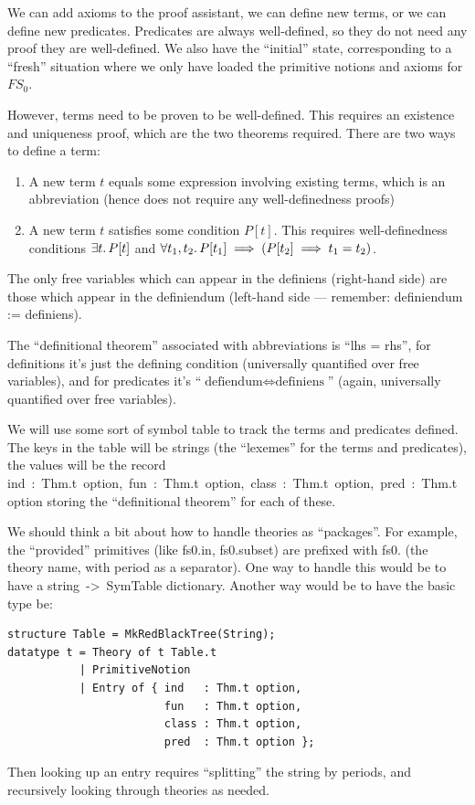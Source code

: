 \begin{node}
We can add axioms to the proof assistant, we can define new terms, or
we can define new predicates. Predicates are always well-defined, so
they do not need any proof they are well-defined. We also have the
``initial'' state, corresponding to a ``fresh'' situation where we
only have loaded the primitive notions and axioms for $FS_{0}$.

However, terms need to be proven to be well-defined. This requires an
existence and uniqueness proof, which are the two theorems
required. There are two ways to define a term:
\begin{enumerate}
\item A new term $t$ equals some expression involving existing terms,
  which is an abbreviation (hence does not require any
  well-definedness proofs)
\item A new term $t$ satisfies some condition $P[t]$. This requires
  well-definedness conditions $\exists t\ldotp P[t]$ and
  $\forall t_{1},t_{2}\ldotp P[t_{1}]\implies(P[t_{2}]\implies t_{1}=t_{2})$.
\end{enumerate}
The only free variables which can appear in the definiens (right-hand side) are those
which appear in the definiendum (left-hand side --- remember:
definiendum := definiens).

The ``definitional theorem'' associated with abbreviations is ``lhs = rhs'',
for definitions it's just the defining condition (universally
quantified over free variables), and for predicates it's
``$\mbox{defiendum}\iff\mbox{definiens}$'' (again, universally
quantified over free variables).
\end{node}

\begin{node}
We will use some sort of symbol table to track the terms and
predicates defined. The keys in the table will be strings (the
``lexemes'' for the terms and predicates), the values will be the
record {\Tt{}{\nwlbrace}ind\ :\ Thm.t\ option,\ fun\ :\ Thm.t\ option,\ class\ :\ Thm.t\ option,\ pred\ :\ Thm.t\ option{\nwrbrace}\nwendquote}
storing the ``definitional theorem'' for each of these.
\end{node}

\begin{node}
We should think a bit about how to handle theories as
``packages''. For example, the ``provided'' primitives (like
{\Tt{}fs0.in\nwendquote}, {\Tt{}fs0.subset\nwendquote}) are prefixed with {\Tt{}fs0.\nwendquote} (the theory
name, with period as a separator). One way to handle this would be to
have a {\Tt{}string\ ->\ SymTable\nwendquote} dictionary. Another way would be to have
the basic type be:
\begin{verbatim}
structure Table = MkRedBlackTree(String);
datatype t = Theory of t Table.t
           | PrimitiveNotion
           | Entry of { ind   : Thm.t option, 
                        fun   : Thm.t option,
                        class : Thm.t option,
                        pred  : Thm.t option };
\end{verbatim}
Then looking up an entry requires ``splitting'' the string by periods,
and recursively looking through theories as needed.
\end{node}

